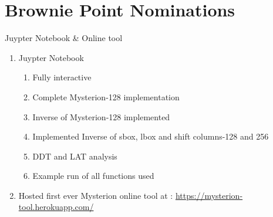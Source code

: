 \section{Brownie Point Nominations}

\begin{frame}{ Juypter Notebook \& Online tool}
\begin{enumerate}
    \item Juypter Notebook
    \begin{enumerate}
        \item Fully interactive
        \item Complete Mysterion-128 implementation
        \item Inverse of Mysterion-128 implemented
        \item Implemented Inverse of sbox, lbox and shift columns-128 and 256 
        \item DDT and LAT analysis
        \item Example run of all functions used
    \end{enumerate}
    \item Hosted first ever Mysterion online tool at : \url{https://mysterion-tool.herokuapp.com/}
\end{enumerate}

\end{frame}
